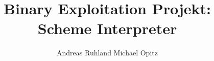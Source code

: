 \documentclass{sig-alternate}
\begin{document}
\title{Binary Exploitation Projekt: Scheme Interpreter}


\author{
\alignauthor
Andreas Ruhland
\alignauthor
Michael Opitz
}

\maketitle





\end{document}
